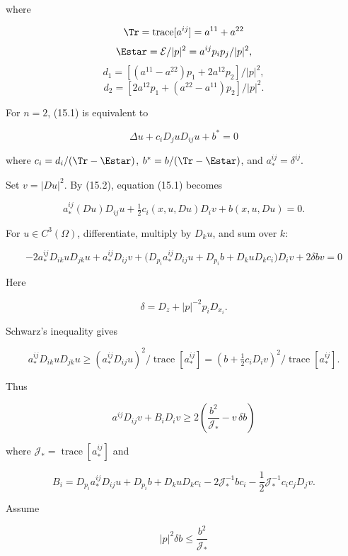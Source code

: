 where

\[
\Tr=\operatorname{trace}[a^{ij}]=a^{11}+a^{22}
\]
\[
\Estar=\mathcal{E}/|p|^2=a^{ij}p_ip_j/|p|^2,
\]
\[
d_1=[(a^{11}-a^{22})p_1+2a^{12}p_2]/|p|^2,
\]
\[
d_2=[2a^{12}p_1+(a^{22}-a^{11})p_2]/|p|^2.
\]

For \(n=2\), (15.1) is equivalent to

\begin{equation}
\Delta u+c_iD_j uD_{ij}u+b^*=0
\tag{15.6}
\end{equation}

where \(c_i=d_i/(\Tr-\Estar)\), \(b^*=b/(\Tr-\Estar)\), and
\(a_*^{ij}=\delta^{ij}\).

Set \(v=|Du|^2\). By (15.2), equation (15.1) becomes

\[
a_*^{ij}(Du)D_{ij}u+\tfrac12 c_i(x,u,Du)D_iv+b(x,u,Du)=0.
\]




For \(u\in C^3(\Omega)\), differentiate, multiply by \(D_ku\), and sum over \(k\):

\begin{equation}
\tag{15.7}
-2a_*^{ij}D_{ik}uD_{jk}u+a_*^{ij}D_{ij}v+\bigl(D_{p_i}a_*^{ij}D_{ij}u+D_{p_i}b+D_kuD_kc_i\bigr)D_iv+2\delta bv=0
\end{equation}

Here

\begin{equation}
\tag{15.8}
\delta=D_z+|p|^{-2}p_iD_{x_i}.
\end{equation}

Schwarz's inequality gives

\begin{equation}
\tag{15.9}
a_*^{ij}D_{ik}uD_{jk}u\ge (a_*^{ij}D_{ij}u)^2/\operatorname{trace}[a_*^{ij}]
=(b+\tfrac12c_iD_iv)^2/\operatorname{trace}[a_*^{ij}].
\end{equation}

Thus

\begin{equation}
\tag{15.10}
a^{ij}D_{ij}v+B_iD_iv\ge 2\left(\frac{b^2}{\mathcal{J}_*}-v\,\delta b\right)
\end{equation}

where $\mathcal{J}_*=\operatorname{trace}[a_*^{ij}]$ and

\[
B_i=D_{p_i}a_*^{ij}D_{ij}u+D_{p_i}b+D_kuD_kc_i-2\mathcal{J}_*^{-1}bc_i-\frac12\mathcal{J}_*^{-1}c_ic_jD_jv.
\]

Assume

\begin{equation}
\tag{15.11}
|p|^2\delta b\le \frac{b^2}{\mathcal{J}_*}
\end{equation}

